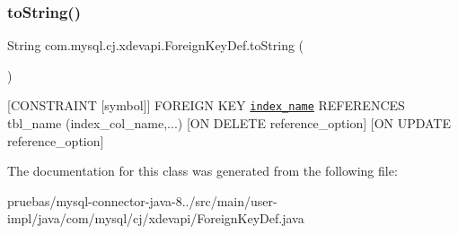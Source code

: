 \subsubsection{\texorpdfstring{to\+String()}{toString()}}
{\footnotesize\ttfamily String com.\+mysql.\+cj.\+xdevapi.\+Foreign\+Key\+Def.\+to\+String (\begin{DoxyParamCaption}{ }\end{DoxyParamCaption})}

\mbox{[}C\+O\+N\+S\+T\+R\+A\+I\+NT \mbox{[}symbol\mbox{]}\mbox{]} F\+O\+R\+E\+I\+GN K\+EY \href{index_col_name, ...}{\tt index\+\_\+name} R\+E\+F\+E\+R\+E\+N\+C\+ES tbl\+\_\+name (index\+\_\+col\+\_\+name,...) \mbox{[}ON D\+E\+L\+E\+TE reference\+\_\+option\mbox{]} \mbox{[}ON U\+P\+D\+A\+TE reference\+\_\+option\mbox{]} 

The documentation for this class was generated from the following file\+:\begin{DoxyCompactItemize}
\item 
pruebas/mysql-\/connector-\/java-\/8../src/main/user-\/impl/java/com/mysql/cj/xdevapi/Foreign\+Key\+Def.\+java\end{DoxyCompactItemize}
